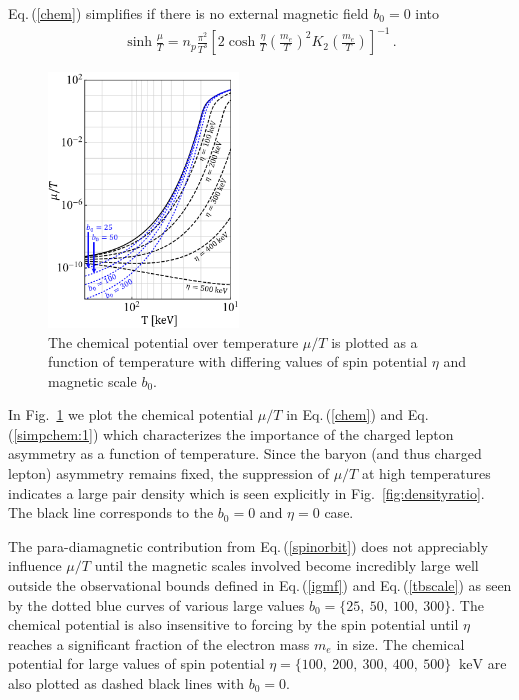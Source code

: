 \documentclass[aps,prd,floatfix,reprint]{revtex4-2}
\newcommand*{\keV}{\text{ keV}}
\newcommand{\req}[1]{Eq.\,(\ref{#1})}
\newcommand{\rf}[1]{Fig.~{\ref{#1}}}
\begin{document}
\req{chem} simplifies if there is no external magnetic field $b_{0}=0$ into
\begin{align}
    \label{simpchem:1}
    \sinh\frac{\mu}{T}=n_{p}\frac{\pi^{2}}{T^{3}}\left[2\cosh\frac{\eta}{T}\left(\frac{m_{e}}{T}\right)^{2}K_{2}\left(\frac{m_{e}}{T}\right)\right]^{-1}\,.
\end{align}

\begin{figure}[ht]
 \centering
 \includegraphics[width=0.45\textwidth]{plots/ChemicalPotential_06.png}
 \caption{The chemical potential over temperature $\mu/T$ is plotted as a function of temperature with differing values of spin potential $\eta$ and magnetic scale $b_{0}$.}
 \label{fig:chemicalpotential}
\end{figure}

In \rf{fig:chemicalpotential} we plot the chemical potential $\mu/T$ in \req{chem} and \req{simpchem:1} which characterizes the importance of the charged lepton asymmetry as a function of temperature. Since the baryon (and thus charged lepton) asymmetry remains fixed, the suppression of $\mu/T$ at high temperatures indicates a large pair density which is seen explicitly in \rf{fig:densityratio}. The black line corresponds to the $b_{0}=0$ and $\eta=0$ case. 

The para-diamagnetic contribution from \req{spinorbit} does not appreciably influence $\mu/T$ until the magnetic scales involved become incredibly large well outside the observational bounds defined in \req{igmf} and \req{tbscale} as seen by the dotted blue curves of various large values $b_{0}=\{25,\ 50,\ 100,\ 300\}$. The chemical potential is also insensitive to forcing by the spin potential until $\eta$ reaches a significant fraction of the electron mass $m_{e}$ in size. The chemical potential for large values of spin potential $\eta=\{100,\ 200,\ 300,\ 400,\ 500\}\ \keV$ are also plotted as dashed black lines with $b_{0}=0$.
\end{document}
